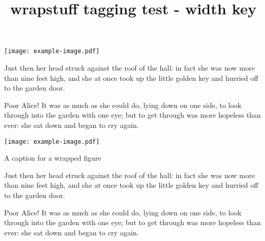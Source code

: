 \documentclass{article}
\title{wrapstuff tagging test - width key}
\begin{document}
\def\lorem{%
Just then her head struck against the roof of the hall:
in fact she was now more than nine feet high, and she
at once took up the little golden key and hurried off
to the garden door.\par
Poor Alice! It was as much as she could do, lying down
on one side, to look through into the garden with one eye;
but to get through was more hopeless than ever:
she sat down and began to cry again.}

\begin{wrapstuff}[c,width=4cm]
\texttt{[image: example-image.pdf]}
\end{wrapstuff}
\lorem

\begin{wrapstuff}[c,width=4cm,type=figure]
\texttt{[image: example-image.pdf]}
\caption{A caption for a wrapped figure}
\end{wrapstuff}
\lorem
\end{document}
